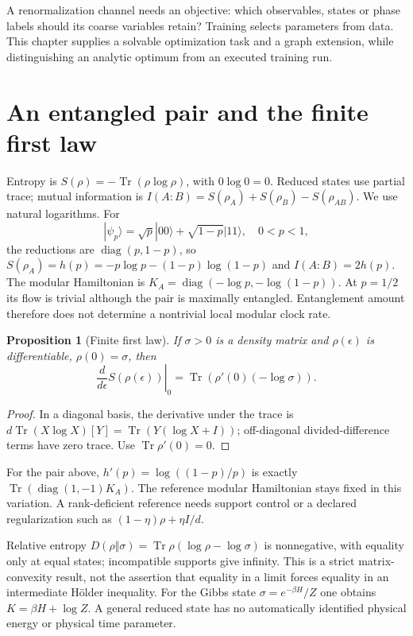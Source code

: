 \documentclass[11pt,oneside,openany]{book}
\newtheorem{proposition}[theorem]{Proposition}
\theoremstyle{definition}\newtheorem{definition}[theorem]{Definition}
\theoremstyle{remark}\newtheorem{remark}[theorem]{Remark}
\begin{document}
A renormalization channel needs an objective: which observables, states or
phase labels should its coarse variables retain? Training selects parameters
from data. This chapter supplies a solvable optimization task and a graph
extension, while distinguishing an analytic optimum from an executed
training run.

\section{An entangled pair and the finite first law}
Entropy is $S(\rho)=-\operatorname{Tr}(\rho\log\rho)$, with $0\log0=0$.
Reduced states use partial trace; mutual information is
$I(A:B)=S(\rho_A)+S(\rho_B)-S(\rho_{AB})$. We use natural logarithms.
For
\[
 |\psi_p\rangle=\sqrt p|00\rangle+\sqrt{1-p}|11\rangle,\quad0<p<1,
\]
the reductions are $\operatorname{diag}(p,1-p)$, so
$S(\rho_A)=h(p)=-p\log p-(1-p)\log(1-p)$ and $I(A:B)=2h(p)$.
The modular Hamiltonian is
$K_A=\operatorname{diag}(-\log p,-\log(1-p))$. At $p=1/2$ its flow is
trivial although the pair is maximally entangled. Entanglement amount
therefore does not determine a nontrivial local modular clock rate.

\begin{proposition}[Finite first law]
If $\sigma>0$ is a density matrix and $\rho(\epsilon)$ is differentiable,
$\rho(0)=\sigma$, then
\[
 \left.\frac{d}{d\epsilon}S(\rho(\epsilon))\right|_0
 =\operatorname{Tr}(\rho'(0)(-\log\sigma)).
\]
\end{proposition}
\begin{proof}
In a diagonal basis, the derivative under the trace is
$d\operatorname{Tr}(X\log X)[Y]=\operatorname{Tr}(Y(\log X+I))$;
off-diagonal divided-difference terms have zero trace. Use
$\operatorname{Tr}\rho'(0)=0$.
\end{proof}
For the pair above, $h'(p)=\log((1-p)/p)$ is exactly
$\operatorname{Tr}(\operatorname{diag}(1,-1)K_A)$. The reference modular
Hamiltonian stays fixed in this variation. A rank-deficient reference needs
support control or a declared regularization such as
$(1-\eta)\rho+\eta I/d$.

Relative entropy
$D(\rho\Vert\sigma)=\operatorname{Tr}\rho(\log\rho-\log\sigma)$ is
nonnegative, with equality only at equal states; incompatible supports
give infinity. This is a strict matrix-convexity result, not the assertion
that equality in a limit forces equality in an intermediate H\"older
inequality. For the Gibbs state $\sigma=e^{-\beta H}/Z$ one obtains
$K=\beta H+\log Z$. A general reduced state has no automatically identified
physical energy or physical time parameter.
\end{document}

